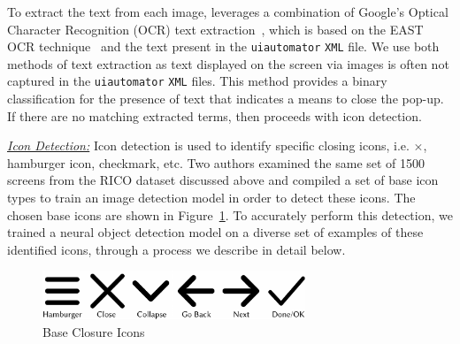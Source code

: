 To extract the text from each image, \MotorEase leverages a combination of Google's Optical Character Recognition (OCR) text extraction~\cite{ocr}, which is based on the EAST OCR technique~\cite{zhou2017east} and the text present in the \texttt{\small uiautomator} \texttt{\small XML} file. We use both methods of text extraction as text displayed on the screen via images is often not captured in the \texttt{\small uiautomator} \texttt{\small XML} files. This method provides a binary classification for the presence of text that indicates a means to close the pop-up. If there are no matching extracted terms, \MotorEase then proceeds with icon detection.


\noindent\emph{\underline{Icon Detection:}} Icon detection is used to identify specific closing icons, i.e. $\times$, hamburger icon, checkmark, etc. Two authors examined the same set of 1500 screens from the RICO dataset discussed above and compiled a set of base icon types to train an image detection model in order to detect these icons. The chosen base icons are shown in Figure~\ref{fig:icons}. To accurately perform this detection, we trained a neural object detection model on a diverse set of examples of these identified icons, through a process we describe in detail below. 

\begin{figure}[t]
    \centering
    \includegraphics[width=0.7\textwidth]{imgs/closure-icons.pdf}
    \caption{Base Closure Icons}
    \label{fig:icons}
\end{figure}

